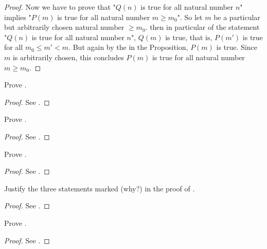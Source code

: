\begin{proof}
Now we have to prove that "\(Q(n)\) is true for all natural number \(n\)" implies "\(P(m)\) is true for all natural number \(m \geq m_0\)". So let \(m\) be a particular but arbitrarily chosen natural number \(\geq m_0\). then in particular of the statement "\(Q(n)\) is true for all natural number \(n\)", \(Q(m)\) is true, that is, \(P(m')\) is true for all \(m_0 \leq m' < m\). But again by the  in the Proposition, \(P(m)\) is true. Since \(m\) is arbitrarily chosen, this concludes \(P(m)\) is true for all natural number \(m \geq m_0\).
\end{proof}

\exercisesection

\begin{exercise}\label{exercise 2.2.1}
    Prove .
\end{exercise}
\begin{proof}
    See .
\end{proof}

\begin{exercise}\label{exercise 2.2.2}
    Prove .
\end{exercise}
\begin{proof}
    See .
\end{proof}

\begin{exercise}\label{exercise 2.2.3}
    Prove .
\end{exercise}
\begin{proof}
    See .
\end{proof}

\begin{exercise}\label{exercise 2.2.4}
    Justify the three statements marked (why?) in the proof of .
\end{exercise}
\begin{proof}
    See .
\end{proof}

\begin{exercise}\label{exercise 2.2.5}
    Prove .
\end{exercise}
\begin{proof}
    See .
\end{proof}

